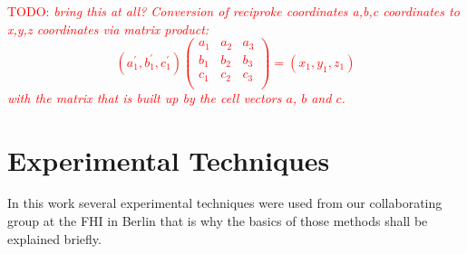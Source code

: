 \documentclass[11pt,DIV=13,BCOR=5mm,a4paper,headinclude]{scrbook}
\newcommand\todo[1]{\textcolor{red}{TODO: \textit{{#1}}}}
\begin{document}
\appendix

\captionsetup{labelformat=myformat}
\def\thefigure{A.\arabic{figure}}
\def\thetable{A.\arabic{table}}
\todo{bring this at all?
Conversion of reciproke coordinates a,b,c coordinates to x,y,z coordinates via matrix product:
\begin{equation*}
  (a_1^\prime, b_1^\prime, c_1^\prime) \left( \begin{array}{ccc}
                   a_1 & a_2 & a_3 \\
                   b_1 & b_2 & b_3 \\
                   c_1 & c_2 & c_3 \\
               \end{array} \right ) =(x_1, y_1, z_1)
\end{equation*}
with the matrix that is built up by the cell vectors $a$, $b$ and $c$.
}
\section{Experimental Techniques}\label{exp_techniques}
In this work several experimental techniques were used from our collaborating group at the FHI in Berlin that is why the basics of those methods shall be explained briefly.
\end{document}

